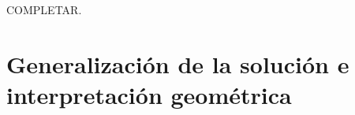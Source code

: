\documentclass[12pt,dvipsnames]{article}
\numberwithin{equation}{section}
\begin{document}
COMPLETAR. %






\section{Generalización de la solución e interpretación geométrica}
\end{document}
